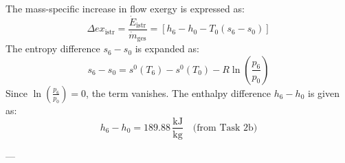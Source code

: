 The mass-specific increase in flow exergy is expressed as:  
\[
\Delta ex_{\text{istr}} = \frac{\dot{E}_{\text{istr}}}{\dot{m}_{\text{ges}}} = \left[ h_6 - h_0 - T_0 \left( s_6 - s_0 \right) \right]
\]  
The entropy difference \( s_6 - s_0 \) is expanded as:  
\[
s_6 - s_0 = s^0(T_6) - s^0(T_0) - R \ln \left( \frac{p_6}{p_0} \right)
\]  
Since \( \ln \left( \frac{p_6}{p_0} \right) = 0 \), the term vanishes.  
The enthalpy difference \( h_6 - h_0 \) is given as:  
\[
h_6 - h_0 = 189.88 \, \frac{\text{kJ}}{\text{kg}} \quad \text{(from Task 2b)}
\]  

---